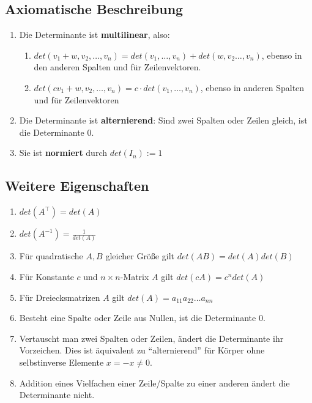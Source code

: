 \documentclass{report}
\begin{document}
\subsection{Axiomatische Beschreibung}
\begin{enumerate}
 \item Die Determinante ist \textbf{multilinear}, also:
 \begin{enumerate}
  \item $det(v_1 + w, v_2, \hdots, v_n) = det(v_1, \hdots, v_n) + det(w, v_2 \hdots, v_n)$, ebenso in den anderen Spalten und für Zeilenvektoren.
  \item $det(cv_1 + w, v_2, \hdots, v_n) = c \cdot det(v_1, \hdots, v_n)$, ebenso in anderen Spalten und für Zeilenvektoren
 \end{enumerate}
 \item Die Determinante ist \textbf{alternierend}: Sind zwei Spalten oder Zeilen gleich, ist die Determinante $0$.
 \item Sie ist \textbf{normiert} durch $det(I_n) := 1$
\end{enumerate}
%
%
\subsection{Weitere Eigenschaften}
\begin{enumerate}

 \item $det(A^\top) = det(A)$
 \item $det(A^{-1}) = \frac{1}{det(A)}$
 \item Für quadratische $A,B$ gleicher Größe gilt $det(AB) = det(A)det(B)$
 \item Für Konstante $c$ und $n \times n$-Matrix $A$ gilt $det(cA) = c^n det(A)$
 \item Für Dreiecksmatrizen $A$ gilt $det(A) = a_{11}a_{22}\hdots a_{nn}$

 \item Besteht eine Spalte oder Zeile aus Nullen, ist die Determinante $0$.
 \item Vertauscht man zwei Spalten oder Zeilen, ändert die Determinante ihr Vorzeichen. Dies ist äquivalent zu ``alternierend'' für Körper ohne selbstinverse Elemente $x = -x \neq 0$.
 \item Addition eines Vielfachen einer Zeile/Spalte zu einer anderen ändert die Determinante nicht.
\end{enumerate}

%
%
\end{document}
